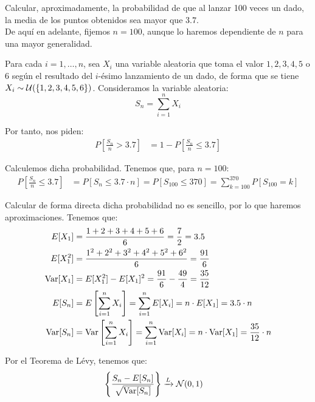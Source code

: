 \begin{ejercicio}
    Calcular, aproximadamente, la probabilidad de que al lanzar 100 veces un dado, la media de los puntos obtenidos sea mayor que $3.7$.\\

    De aquí en adelante, fijemos $n=100$, aunque lo haremos dependiente de $n$ para una mayor generalidad.

    Para cada $i=1, \ldots, n$, sea $X_i$ una variable aleatoria que toma el valor $1, 2, 3, 4, 5$ o $6$ según el resultado del $i$-ésimo lanzamiento de un dado, de forma que se tiene $X_i \sim \mathcal{U}(\{1, 2, 3, 4, 5, 6\})$. Consideramos la variable aleatoria:
    \[
        S_{n} = \sum_{i=1}^{n} X_i
    \]

    Por tanto, nos piden:
    \begin{align*}
        P\left[\frac{S_{n}}{n} > 3.7\right] &= 1 - P\left[\frac{S_{n}}{n} \leq 3.7\right]
    \end{align*}

    Calculemos dicha probabilidad. Tenemos que, para $n=100$:
    \begin{align*}
        P\left[\frac{S_{n}}{n} \leq 3.7\right] &= P\left[S_{n} \leq 3.7 \cdot n\right]
        = P\left[S_{100} \leq 370\right]
        = \sum_{k=100}^{370} P[S_{100} = k]
    \end{align*}

    Calcular de forma directa dicha probabilidad no es sencillo, por lo que haremos aproximaciones. Tenemos que:
    \begin{align*}
        E[X_1] &= \frac{1+2+3+4+5+6}{6} = \frac{7}{2} = 3.5\\
        E[X_1^2] &= \frac{1^2+2^2+3^2+4^2+5^2+6^2}{6} = \frac{91}{6}\\
        \operatorname{Var}[X_1] &= E[X_1^2] - E[X_1]^2 = \frac{91}{6} - \frac{49}{4} = \frac{35}{12}\\
        E[S_{n}] &= E\left[\sum_{i=1}^{n} X_i\right] = \sum_{i=1}^{n} E[X_i] = n \cdot E[X_1] = 3.5 \cdot n\\
        \operatorname{Var}[S_{n}] &= \operatorname{Var}\left[\sum_{i=1}^{n} X_i\right] = \sum_{i=1}^{n} \operatorname{Var}[X_i] = n \cdot \operatorname{Var}[X_1] = \frac{35}{12} \cdot n
    \end{align*}

    Por el Teorema de Lévy, tenemos que:
    \begin{align*}
        \left\{\frac{S_{n}-E[S_n]}{\sqrt{\operatorname{Var}[S_{n}]}}\right\} &\xrightarrow{L} \mathcal{N}(0,1)
    \end{align*}


\end{ejercicio}
